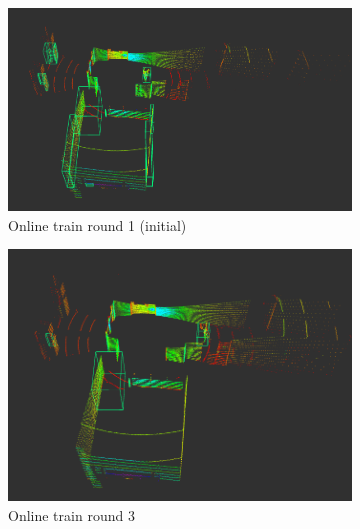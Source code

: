 \begin{figure}[!htb]
    \begin{subfigure}{1\linewidth}
        \centering
        \includegraphics[scale=0.3]{figures/chap3_fig/onlineSVM/online_train_round1.png}
        \caption{Online train round 1 (initial)}
        \label{Chap4:Fig23:sub1}
    \end{subfigure}
    \begin{subfigure}{1\linewidth}
        \centering
        \includegraphics[scale=0.348]{figures/chap3_fig/onlineSVM/online_train_round3.png}
        \caption{Online train round 3}
        \label{Chap4:Fig23:sub2}
    \end{subfigure}
    \begin{subfigure}{1\linewidth}
        \centering

\end{subfigure}
\end{figure}
